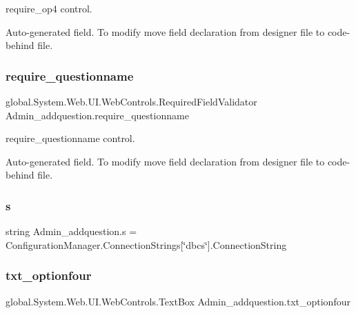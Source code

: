 require\+\_\+op4 control. 

Auto-\/generated field. To modify move field declaration from designer file to code-\/behind file. \mbox{\label{class_admin__addquestion_a3b98200a649b474a5e8d33d139e802da}} 
\subsubsection{\texorpdfstring{require\_questionname}{require\_questionname}}
{\footnotesize\ttfamily global.\+System.\+Web.\+U\+I.\+Web\+Controls.\+Required\+Field\+Validator Admin\+\_\+addquestion.\+require\+\_\+questionname\hspace{0.3cm}{\ttfamily [protected]}}



require\+\_\+questionname control. 

Auto-\/generated field. To modify move field declaration from designer file to code-\/behind file. \mbox{\label{class_admin__addquestion_acf6eac590324e3f04ae082f75d7e6f08}} 
\subsubsection{\texorpdfstring{s}{s}}
{\footnotesize\ttfamily string Admin\+\_\+addquestion.\+s = Configuration\+Manager.\+Connection\+Strings\mbox{[}\char`\"{}dbcs\char`\"{}\mbox{]}.Connection\+String\hspace{0.3cm}{\ttfamily [private]}}

\mbox{\label{class_admin__addquestion_a4332d10640f98e6ca634f96d59d15954}} 
\subsubsection{\texorpdfstring{txt\_optionfour}{txt\_optionfour}}
{\footnotesize\ttfamily global.\+System.\+Web.\+U\+I.\+Web\+Controls.\+Text\+Box Admin\+\_\+addquestion.\+txt\+\_\+optionfour\hspace{0.3cm}{\ttfamily [protected]}}



